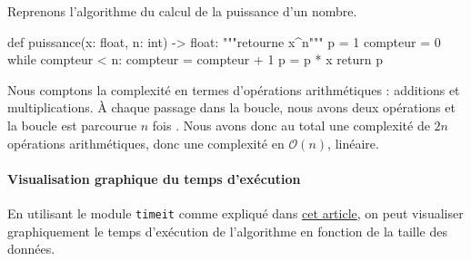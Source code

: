 \documentclass[
  a4paper,
  DIV=11,
  numbers=noendperiod]{scrartcl}
\let\oldparagraph\paragraph
\renewcommand{\paragraph}[1]{\oldparagraph{#1}\mbox{}}
\newenvironment{Shaded}{\begin{snugshade}}{\end{snugshade}}
\newcommand{\BuiltInTok}[1]{\textcolor[rgb]{0.00,0.23,0.31}{#1}}
\newcommand{\CommentTok}[1]{\textcolor[rgb]{0.37,0.37,0.37}{#1}}
\newcommand{\ControlFlowTok}[1]{\textcolor[rgb]{0.00,0.23,0.31}{#1}}
\newcommand{\DecValTok}[1]{\textcolor[rgb]{0.68,0.00,0.00}{#1}}
\newcommand{\KeywordTok}[1]{\textcolor[rgb]{0.00,0.23,0.31}{#1}}
\newcommand{\NormalTok}[1]{\textcolor[rgb]{0.00,0.23,0.31}{#1}}
\newcommand{\OperatorTok}[1]{\textcolor[rgb]{0.37,0.37,0.37}{#1}}
\begin{document}
\begin{tcolorbox}[enhanced jigsaw, bottomrule=.15mm, leftrule=.75mm, opacitybacktitle=0.6, breakable, opacityback=0, toprule=.15mm, colback=white, toptitle=1mm, colbacktitle=quarto-callout-caution-color!10!white, left=2mm, title=\textcolor{quarto-callout-caution-color}{\faFire}\hspace{0.5em}{Exemple}, colframe=quarto-callout-caution-color-frame, arc=.35mm, rightrule=.15mm, titlerule=0mm, bottomtitle=1mm, coltitle=black]

Reprenons l'algorithme du calcul de la puissance d'un nombre.

\begin{Shaded}
\begin{Highlighting}[]
\KeywordTok{def}\NormalTok{ puissance(x: }\BuiltInTok{float}\NormalTok{, n: }\BuiltInTok{int}\NormalTok{) }\OperatorTok{{-}\textgreater{}} \BuiltInTok{float}\NormalTok{:}
    \CommentTok{"""retourne x\^{}n"""}
\NormalTok{    p }\OperatorTok{=} \DecValTok{1}
\NormalTok{    compteur }\OperatorTok{=} \DecValTok{0}
    \ControlFlowTok{while}\NormalTok{ compteur }\OperatorTok{\textless{}}\NormalTok{ n:}
\NormalTok{        compteur }\OperatorTok{=}\NormalTok{ compteur }\OperatorTok{+} \DecValTok{1}
\NormalTok{        p }\OperatorTok{=}\NormalTok{ p }\OperatorTok{*}\NormalTok{ x}
    \ControlFlowTok{return}\NormalTok{ p}
\end{Highlighting}
\end{Shaded}

Nous comptons la complexité en termes d'opérations arithmétiques :
additions et multiplications. À chaque passage dans la boucle, nous
avons deux opérations et la boucle est parcourue \(n\) fois . Nous avons
donc au total une complexité de \(2n\) opérations arithmétiques, donc
une complexité en \(\mathcal{O}(n)\), linéaire.

\end{tcolorbox}

\hypertarget{visualisation-graphique-du-temps-dexuxe9cution}{%
\paragraph{Visualisation graphique du temps
d'exécution}\label{visualisation-graphique-du-temps-dexuxe9cution}}

En utilisant le module \texttt{timeit} comme expliqué dans
\href{https://flallemand.fr/blog/posts/timeexec/}{cet article}, on peut
visualiser graphiquement le temps d'exécution de l'algorithme en
fonction de la taille des données.
\end{document}
